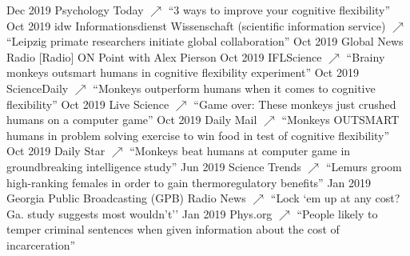 \documentclass[]{friggeri-cv}
\begin{document}
\begin{entrylist}
  \entry
    {Dec 2019}
    {Psychology Today \href{https://www.psychologytoday.com/us/blog/wild-connections/201912/3-ways-improve-your-cognitive-flexibility}{\small $\nearrow$}}
    {}
    {``3 ways to improve your cognitive flexibility''}
  \entry
    {Oct 2019}
    {idw Informationsdienst Wissenschaft (scientific information service) \href{https://idw-online.de/de/news726094}{\small $\nearrow$}}
    {}
    {``Leipzig primate researchers initiate global collaboration''}
  \entry
    {Oct 2019}
    {Global News Radio}
    {}
    {{[}Radio{]} ON Point with Alex Pierson}
  \entry
    {Oct 2019}
    {IFLScience \href{https://www.iflscience.com/brain/brainy-monkeys-outsmart-humans-in-cognitive-flexibility-experiment/}{\small $\nearrow$}}
    {}
    {``Brainy monkeys outsmart humans in cognitive flexibility experiment''}
  \entry
    {Oct 2019}
    {ScienceDaily \href{https://www.sciencedaily.com/releases/2019/10/191015115356.htm}{\small $\nearrow$}}
    {}
    {``Monkeys outperform humans when it comes to cognitive flexibility''}
  \entry
    {Oct 2019}
    {Live Science \href{https://www.livescience.com/monkeys-outsmart-humans.html}{\small $\nearrow$}}
    {}
    {``Game over: These monkeys just crushed humans on a computer game''}
  \entry
    {Oct 2019}
    {Daily Mail \href{https://www.dailymail.co.uk/sciencetech/article-7585197/Monkeys-OUTSMART-humans-problem-solving-exercise-win-food-test-cognitive-flexibility.html}{\small $\nearrow$}}
    {}
    {``Monkeys OUTSMART humans in problem solving exercise to win food in test of cognitive flexibility''}
  \entry
    {Oct 2019}
    {Daily Star \href{https://www.dailystar.co.uk/news/weird-news/monkeys-beat-humans-computer-game-20642153}{\small $\nearrow$}}
    {}
    {``Monkeys beat humans at computer game in groundbreaking intelligence study''}
  \entry
    {Jun 2019}
    {Science Trends \href{https://sciencetrends.com/lemurs-groom-high-ranking-females-in-order-to-gain-thermoregulatory-benefits/}{\small $\nearrow$}}
    {}
    {``Lemurs groom high-ranking females in order to gain thermoregulatory benefits''}
  \entry
    {Jan 2019}
    {Georgia Public Broadcasting (GPB) Radio News \href{https://www.gpbnews.org/post/lock-em-any-cost-ga-study-suggests-most-wouldnt}{\small $\nearrow$}}
    {}
    {``Lock `em up at any cost? Ga. study suggests most wouldn't''}
  \entry
    {Jan 2019}
    {Phys.org \href{https://phys.org/news/2019-01-people-temper-criminal-sentences-incarceration.html}{\small $\nearrow$}}
    {}
    {``People likely to temper criminal sentences when given information about the cost of incarceration''}
\end{entrylist}
\end{document}
